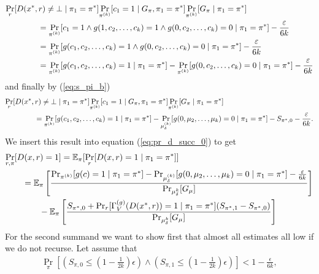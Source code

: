 \begin{align*}
  &\underset{r}{\Pr}[D(x^*,r) \neq \bot \mid \pi_1 = \pi^*]
  \underset{\pi^{(k)}}{\Pr}[c_1 = 1 \mid G_{\pi}, \pi_1 = \pi^*]
  \underset{\pi^{(k)}}{\Pr}[G_{\pi} \mid \pi_1 = \pi^*] \notag\\
  &\mbox\qquad\qquad = \underset{\pi^{(k)}}{\Pr}[c_1 = 1 \land g(1, c_2,\dots, c_k) = 1 \land g(0, c_2, \dots, c_k) = 0 \mid \pi_1 = \pi^*] - \frac{\varepsilon}{6k} \\
  &\mbox\qquad\qquad = \underset{\pi^{(k)}}{\Pr}[g(c_1, c_2,\dots, c_k) = 1 \land g(0, c_2, \dots, c_k) = 0 \mid \pi_1 = \pi^*] - \frac{\varepsilon}{6k} \\
  &\mbox\qquad\qquad = \underset{\pi^{(k)}}{\Pr}[g(c_1, c_2,\dots, c_k) = 1 \mid \pi_1 = \pi^*] -  \underset{\pi^{(k)}}{\Pr}[g(0, c_2, \dots, c_k) = 0 \mid \pi_1 = \pi^*] - \frac{\varepsilon}{6k} \\
\end{align*}
and finally by (\ref{eq:s_pi_b})
\begin{align}
  &\underset{r}{\Pr}[D(x^*,r) \neq \bot \mid \pi_1 = \pi^*]
  \underset{\pi^{(k)}}{\Pr}[c_1 = 1 \mid G_{\pi}, \pi_1 = \pi^*]
  \underset{\pi^{(k)}}{\Pr}[G_{\pi} \mid \pi_1 = \pi^*] \notag\\
  &\mbox\qquad\qquad = \underset{\pi^{(k)}}{\Pr}[g(c_1, c_2,\dots, c_k) = 1 \mid \pi_1 = \pi^*] -  \underset{\mu_{\delta}^{(k)}}{\Pr}[g(0, \mu_2, \dots, \mu_k) = 0 \mid \pi_1 = \pi^*]  - S_{\pi^*,0} - \frac{\varepsilon}{6k}.
\end{align}
We insert this result into equation (\ref{eq:pr_d_succ_0}) to get
\begin{align}
\label{eq:pr_d_succ_1}
  &\underset{r,\pi}{\Pr}[D(x,r) = 1] = \mathbb{E_{\pi}}[\underset{r}{\Pr}[D(x,r) = 1 \mid \pi_1 = \pi^*]] \notag\\
&\mbox\qquad = \mathbb{E}_{\pi}\left[\frac{{\Pr}_{\pi^{(k)}}[g(c) = 1 \mid \pi_1 = \pi^*] -
{\Pr}_{\mu_{\delta}^{(k)}}[g(0, \mu_2, \dots, \mu_k) = 0 \mid \pi_1 = \pi^*] - \frac{\varepsilon}{6k}} {{\Pr}_{\mu_{\delta}^{k}}[G_{\mu}]}\right] \notag\\
&\mbox\qquad\qquad - \mathbb{E}_{\pi}\left[\frac{
  S_{\pi^*,0} + \Pr_r [\Gamma_V^{(g)}(D(x^*,r)) = 1 \mid \pi_1 = \pi^*](S_{\pi^*,1} - S_{\pi^*,0})}
{{\Pr}_{\mu_{\delta}^{k}}[G_{\mu}]}\right]
\end{align}
For the second summand we want to show first that almost all estimates all low if we do not recurse.
Let assume that
\begin{align}
\underset{\pi}{\Pr}\left[\left(S_{\pi,0} \leq (1 - \frac{1}{2k})\epsilon\right) \land \left( S_{\pi,1} \leq (1-\frac{1}{2k})\epsilon\right)\right] < 1 - \frac{\epsilon}{6k},
\end{align}
